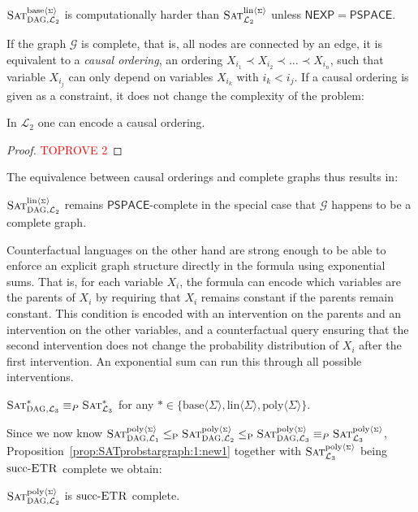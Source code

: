 \documentclass[a4paper,UKenglish,cleveref, autoref, thm-restate]{lipics-v2021}
\newcommand{\succETR}{\ensuremath{\textup{succ}\text{-}\textsc{ETR}}}
\newcommand{\NEXP}{\ensuremath{\mathsf{NEXP}}}
\newcommand{\PSPACE}{\ensuremath{\mathsf{PSPACE}}}
\newcommand{\leqp}{\leq_{\text{P}}}
\newcommand{\cL}{{\mathcal L}}
\def\probsumname#1#2{^{\text{#1}{\langle{\scriptscriptstyle\Sigma}\rangle}}_{\text{#2}}}
\def\probsumgraphname#1#2{^{\text{#1}{\langle{\scriptscriptstyle\Sigma}\rangle}}_{\mbox{\scriptsize\sc DAG}, \text{#2}}}
\newcommand{\SATcausalstar}{\mbox{\sc Sat}^{*}_{\cL_3}}
\newcommand{\SATcausalstargraph}{\mbox{\sc Sat}^{*}_{\mbox{\scriptsize\sc DAG}, {\cL_3}}}
\newcommand{\SATprobpolysumgraph}{\mbox{\sc Sat}\probsumgraphname{poly}{${\cal L}_1$}}
\newcommand{\SATinterventcompsumgraph}{\mbox{\sc Sat}\probsumgraphname{base}{${\cal L}_2$}}
\newcommand{\SATinterventlinsumgraph}{\mbox{\sc Sat}\probsumgraphname{lin}{${\cal L}_2$}}
\newcommand{\SATinterventpolysumgraph}{\mbox{\sc Sat}\probsumgraphname{poly}{${\cal L}_2$}}
\newcommand{\SATcausalpolysumgraph}{\mbox{\sc Sat}\probsumgraphname{poly}{${\cal L}_3$}}
\newcommand{\SATinterventlinsum}{\mbox{\sc Sat}\probsumname{lin}{${\cal L}_2$}}
\newcommand{\SATcausalpolysum}{\mbox{\sc Sat}\probsumname{poly}{${\cal L}_3$}}
\begin{document}
\begin{corollary}	
	$\SATinterventcompsumgraph$ is computationally harder than  $\SATinterventlinsum$ unless 
	$\NEXP = \PSPACE$.	
\end{corollary}


If the graph $\mathcal{G}$ is complete, that is, all nodes are connected by an edge, 
it is equivalent to a \emph{causal ordering}, an ordering $X_{i_1} \prec X_{i_2} \prec \ldots \prec X_{i_n}$, such that variable $X_{i_j}$ can only depend on variables $X_{i_k}$ with $i_k < i_j$.
If a causal ordering is given as a constraint, it does not change the complexity of the problem:

\begin{lemma}\label{lemm:causal:ordering}
    In $\cL_2$ one can encode a causal ordering.
\end{lemma}
\begin{proof}\textcolor{red}{TOPROVE 2}\end{proof}

The equivalence between causal orderings and complete graphs thus results in:
\begin{corollary}
$\SATinterventlinsumgraph$ remains  $\PSPACE$-complete in the special case that  $\mathcal{G}$ happens to be a complete graph. 
\end{corollary}

Counterfactual languages on the other hand are strong enough to be able to enforce an explicit graph structure directly in the formula using exponential sums. 
That is, for each variable $X_i$, the formula can encode which variables are the parents of $X_i$ by requiring that $X_i$ remains constant if the parents remain constant. This condition is encoded with an intervention on the parents and an intervention on the other variables, and a counterfactual query ensuring that the second intervention does not change the probability distribution of $X_i$ after the first intervention. An exponential sum can run this through all possible interventions.
\begin{theorem}
    \label{thm:causal_with_graph:reduction}
     $\SATcausalstargraph \equiv_P \SATcausalstar$
    for any $*\in \{\text{base}\langle{\Sigma}\rangle, \text{lin}\langle{\Sigma}\rangle, \text{poly}\langle{\Sigma}\rangle\}$.
\end{theorem}
\onlyFull{
\begin{proof}\textcolor{red}{TOPROVE 3}\end{proof}}

Since we now know $\SATprobpolysumgraph \leqp \SATinterventpolysumgraph \leqp \SATcausalpolysumgraph \equiv_P \SATcausalpolysum$, Proposition~\ref{prop:SATprobstargraph:1:new1} together with $\SATcausalpolysum$ being $\succETR$ complete \cite{doerflerICLR2025} we obtain:
\begin{corollary}
    $\SATinterventpolysumgraph$ is $\succETR$ complete.
\end{corollary}
\end{document}
